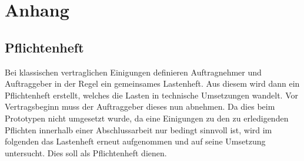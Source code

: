 
\chapter*{Anhang}


\section*{Pflichtenheft}

Bei klassischen vertraglichen Einigungen definieren Auftragnehmer und Auftraggeber in der Regel ein gemeinsames Lastenheft. Aus diesem wird dann ein Pflichtenheft erstellt, welches die Lasten in technische Umsetzungen wandelt. Vor Vertragsbeginn muss der Auftraggeber dieses nun abnehmen. Da dies beim Prototypen nicht umgesetzt wurde, da eine Einigungen zu den zu erledigenden Pflichten innerhalb einer Abschlussarbeit nur bedingt sinnvoll ist, wird im folgenden das Lastenheft erneut aufgenommen und auf seine Umsetzung untersucht. Dies soll als Pflichtenheft dienen.

